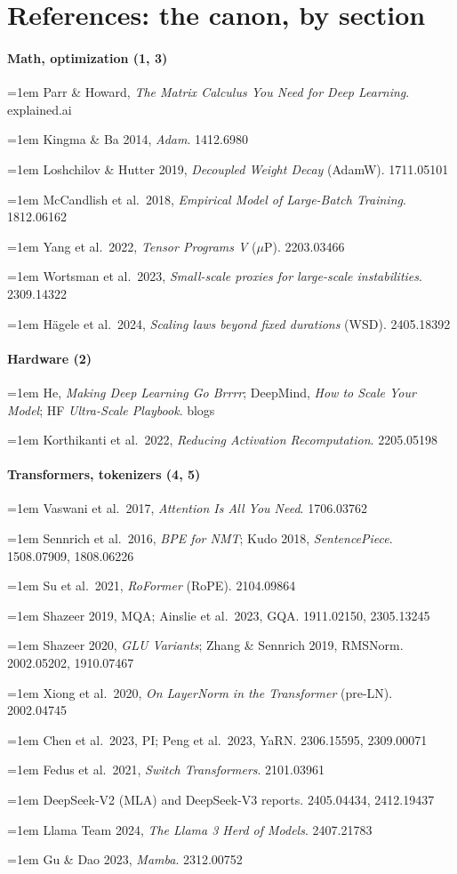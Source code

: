 \section{References: the canon, by section}
{\small\raggedright
\newcommand{\rf}[2]{\par\noindent\hangindent=1em\hangafter=1 #1 {\color{mute}\ttfamily\scriptsize #2}\par}

\paragraph{Math, optimization (1, 3)}
\rf{Parr \& Howard, \emph{The Matrix Calculus You Need for Deep Learning}.}{explained.ai}
\rf{Kingma \& Ba 2014, \emph{Adam}.}{1412.6980}
\rf{Loshchilov \& Hutter 2019, \emph{Decoupled Weight Decay} (AdamW).}{1711.05101}
\rf{McCandlish et al.\ 2018, \emph{Empirical Model of Large-Batch Training}.}{1812.06162}
\rf{Yang et al.\ 2022, \emph{Tensor Programs V} ($\mu$P).}{2203.03466}
\rf{Wortsman et al.\ 2023, \emph{Small-scale proxies for large-scale instabilities}.}{2309.14322}
\rf{H\"agele et al.\ 2024, \emph{Scaling laws beyond fixed durations} (WSD).}{2405.18392}

\paragraph{Hardware (2)}
\rf{He, \emph{Making Deep Learning Go Brrrr}; DeepMind, \emph{How to Scale Your Model}; HF \emph{Ultra-Scale Playbook}.}{blogs}
\rf{Korthikanti et al.\ 2022, \emph{Reducing Activation Recomputation}.}{2205.05198}

\paragraph{Transformers, tokenizers (4, 5)}
\rf{Vaswani et al.\ 2017, \emph{Attention Is All You Need}.}{1706.03762}
\rf{Sennrich et al.\ 2016, \emph{BPE for NMT}; Kudo 2018, \emph{SentencePiece}.}{1508.07909, 1808.06226}
\rf{Su et al.\ 2021, \emph{RoFormer} (RoPE).}{2104.09864}
\rf{Shazeer 2019, MQA; Ainslie et al.\ 2023, GQA.}{1911.02150, 2305.13245}
\rf{Shazeer 2020, \emph{GLU Variants}; Zhang \& Sennrich 2019, RMSNorm.}{2002.05202, 1910.07467}
\rf{Xiong et al.\ 2020, \emph{On LayerNorm in the Transformer} (pre-LN).}{2002.04745}
\rf{Chen et al.\ 2023, PI; Peng et al.\ 2023, YaRN.}{2306.15595, 2309.00071}
\rf{Fedus et al.\ 2021, \emph{Switch Transformers}.}{2101.03961}
\rf{DeepSeek-V2 (MLA) and DeepSeek-V3 reports.}{2405.04434, 2412.19437}
\rf{Llama Team 2024, \emph{The Llama 3 Herd of Models}.}{2407.21783}
\rf{Gu \& Dao 2023, \emph{Mamba}.}{2312.00752}

}
